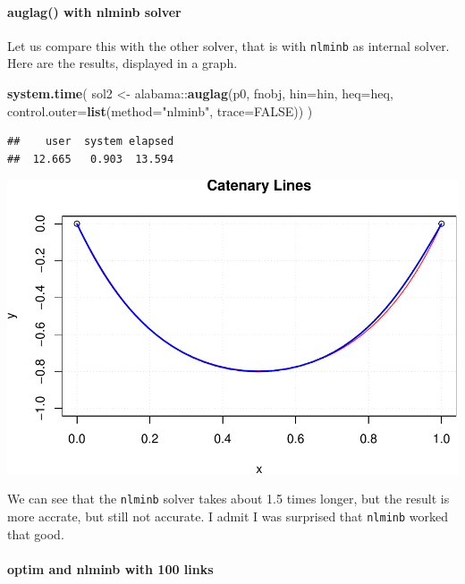 \documentclass[]{article}
\newenvironment{Shaded}{\begin{snugshade}}{\end{snugshade}}
\newcommand{\KeywordTok}[1]{\textcolor[rgb]{0.13,0.29,0.53}{\textbf{{#1}}}}
\newcommand{\DataTypeTok}[1]{\textcolor[rgb]{0.13,0.29,0.53}{{#1}}}
\newcommand{\StringTok}[1]{\textcolor[rgb]{0.31,0.60,0.02}{{#1}}}
\newcommand{\OtherTok}[1]{\textcolor[rgb]{0.56,0.35,0.01}{{#1}}}
\newcommand{\NormalTok}[1]{{#1}}
\let\oldparagraph\paragraph
\renewcommand{\paragraph}[1]{\oldparagraph{#1}\mbox{}}
\begin{document}
\paragraph{auglag() with nlminb solver}\label{auglag-with-nlminb-solver}

Let us compare this with the other solver, that is with \texttt{nlminb}
as internal solver. Here are the results, displayed in a graph.

\begin{Shaded}
\begin{Highlighting}[]
\KeywordTok{system.time}\NormalTok{(}
\NormalTok{sol2 <-}\StringTok{ }\NormalTok{alabama::}\KeywordTok{auglag}\NormalTok{(p0, fnobj, }\DataTypeTok{hin=}\NormalTok{hin, }\DataTypeTok{heq=}\NormalTok{heq,}
                       \DataTypeTok{control.outer=}\KeywordTok{list}\NormalTok{(}\DataTypeTok{method=}\StringTok{"nlminb"}\NormalTok{, }\DataTypeTok{trace=}\OtherTok{FALSE}\NormalTok{))}
\NormalTok{)}
\end{Highlighting}
\end{Shaded}

\begin{verbatim}
##    user  system elapsed 
##  12.665   0.903  13.594
\end{verbatim}

\includegraphics{catenary_files/figure-latex/unnamed-chunk-9-1.pdf}

We can see that the \texttt{nlminb} solver takes about 1.5 times longer,
but the result is more accrate, but still not accurate. I admit I was
surprised that \texttt{nlminb} worked that good.

\paragraph{optim and nlminb with 100
links}\label{optim-and-nlminb-with-100-links}
\end{document}
